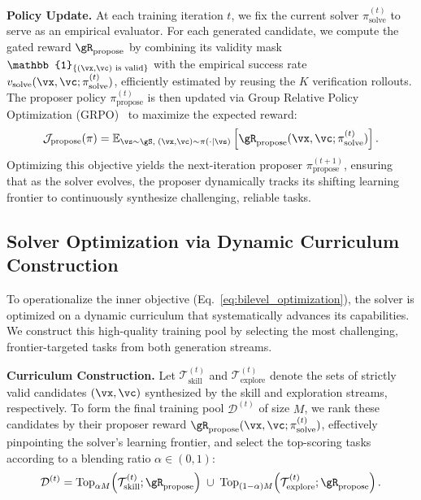\textbf{Policy Update.}
At each training iteration $t$, we fix the current solver $\pi_{\text{solve}}^{(t)}$ to serve as an empirical evaluator. For each generated candidate, we compute the gated reward $\gR_\text{propose}$ by combining its validity mask $\mathbb{1}_{\{(\vx,\vc) \text{ is valid}\}}$ with the empirical success rate $v_\text{solve}(\vx,\vc;\pi_{\text{solve}}^{(t)})$, efficiently estimated by reusing the $K$ verification rollouts. The proposer policy $\pi_{\text{propose}}^{(t)}$ is then updated via Group Relative Policy Optimization (GRPO)~\citep{shao2024deepseekmath} to maximize the expected reward:
\begin{equation}
\mathcal{J}_{\text{propose}}(\pi)
=
\mathbb{E}_{\vs \sim \gS, \; (\vx,\vc) \sim \pi(\cdot \mid \vs)}
\left[
\gR_{\text{propose}}
(\vx,\vc;\pi_{\text{solve}}^{(t)})
\right].
\label{eq:proposer_rl_objective}
\end{equation}
Optimizing this objective yields the next-iteration proposer $\pi_{\text{propose}}^{(t+1)}$, ensuring that as the solver evolves, the proposer dynamically tracks its shifting learning frontier to continuously synthesize challenging, reliable tasks.



\subsection{Solver Optimization via Dynamic Curriculum Construction}
\label{sec:solver_optimization}

To operationalize the inner objective (Eq.~\ref{eq:bilevel_optimization}), the solver is optimized on a dynamic curriculum that systematically advances its capabilities. We construct this high-quality training pool by selecting the most challenging, frontier-targeted tasks from both generation streams.

\textbf{Curriculum Construction.}
Let $\mathcal{T}_{\text{skill}}^{(t)}$ and $\mathcal{T}_{\text{explore}}^{(t)}$ denote the sets of strictly valid candidates $(\vx,\vc)$ synthesized by the skill and exploration streams, respectively. To form the final training pool $\mathcal{D}^{(t)}$ of size $M$, we rank these candidates by their proposer reward $\gR_{\text{propose}}(\vx,\vc;\pi_{\text{solve}}^{(t)})$, effectively pinpointing the solver's learning frontier, and select the top-scoring tasks according to a blending ratio $\alpha \in (0,1)$:
\begin{equation}
    \mathcal{D}^{(t)}
    =
    \mathrm{Top}_{\alpha M} \! \left(\mathcal{T}_{\text{skill}}^{(t)}; \gR_\text{propose}\right)
    \; \cup \;
    \mathrm{Top}_{(1-\alpha) M} \! \left(\mathcal{T}_{\text{explore}}^{(t)}; \gR_\text{propose}\right).
    \label{eq:mixed_pool}
\end{equation}

